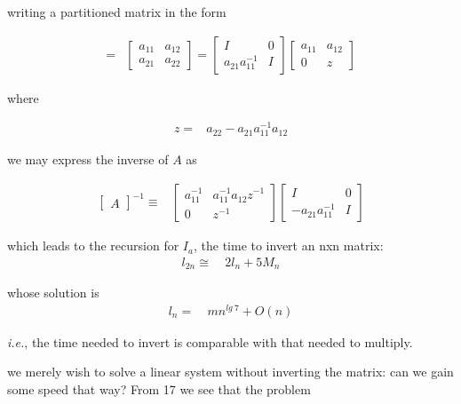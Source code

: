  writing a partitioned matrix in the form

\begin{align}
    [A]                     =& 
    \begin{bmatrix}
      a_{11} & a_{12} \\
      a_{21} & a_{22}
    \end{bmatrix}
    =
    \begin{bmatrix}
      I                 & 0 \\
      a_{21}^{}a_{11}^{-1} & I
    \end{bmatrix}
    \begin{bmatrix}
      a_{11} & a_{12} \\
      0      & z
    \end{bmatrix}
\end{align}

where

\begin{align}
    z =& a_{22} - a_{21}a_{11}^{-1}a_{12}
\end{align}

we may express the inverse of $A$ as

\begin{align}
    \begin{bmatrix}
      A
    \end{bmatrix}^{-1} \equiv&
    \begin{bmatrix}
      a_{11}^{-1} & a_{11}^{-1}a_{12}^{}z^{-1} \\
      0           & z^{-1}
    \end{bmatrix}
    \begin{bmatrix}
      I                     & 0 \\
      -a_{21}^{}a_{11}^{-1} & I
    \end{bmatrix}
\end{align}

which leads to the recursion for $I_{a}$, the time to invert an nxn matrix:
\begin{align}
l_{2n} \cong&\ 2l_{n} + 5M_{n}
\end{align} 

whose solution is
\begin{align}
l_{n} =&\ mn^{lg\ 7} + O(n)
\end{align}

\textit{i.e.}, the time needed to invert is comparable with that needed to multiply.

 we merely wish to solve a linear system without inverting the matrix: can we gain some speed that way? From 17 we
see that the problem

